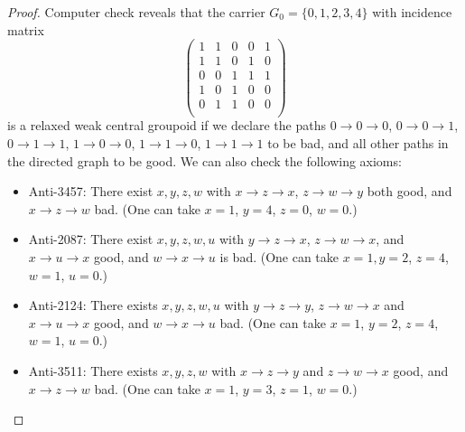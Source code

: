 \begin{proof}  Computer check reveals that the carrier $G_0=\{0,1,2,3 ,4\}$ with incidence matrix
$$
\begin{pmatrix}
  1 & 1 & 0 & 0 & 1 \\
  1 & 1 & 0 & 1 & 0 \\
  0 & 0 & 1 & 1 & 1 \\
  1 & 0 & 1 & 0 & 0 \\
  0 & 1 & 1 & 0 & 0 \\
  \end{pmatrix}
$$
is a relaxed weak central groupoid if we declare the paths $0 \to 0 \to 0$, $0 \to 0 \to 1$, $0 \to 1 \to 1$, $1 \to 0 \to 0$, $1 \to 1 \to 0$, $1 \to 1 \to 1$ to be bad, and all other paths in the directed graph to be good.  We can also check the following axioms:
\begin{itemize}
  \item Anti-3457: There exist $x,y,z,w$ with $x \to z \to x$,  $z \to w \to y$ both good, and $x \to z \to w$ bad. (One can take $x=1$, $y=4$, $z = 0$, $w = 0$.)
  \item Anti-2087: There exist $x,y,z,w,u$ with $y \to z \to x$, $z \to w \to x$, and $x \to u \to x$ good, and $w \to x \to u$ is bad. (One can take $x=1, y=2$, $z=4$, $w=1$, $u=0$.)
  \item Anti-2124: There exists $x,y,z,w,u$ with $y \to z \to y$, $z \to w \to x$ and $x \to u \to x$ good, and $w \to x \to u$  bad. (One can take $x=1$, $y=2$, $z=4$, $w = 1$, $u=0$.)
  \item Anti-3511: There exists $x,y,z,w$ with $x \to z \to y$ and $z \to w \to x$ good, and $x \to z \to w$ bad. (One can take $x=1$, $y=3$, $z = 1$, $w=0$.)
\end{itemize}


\end{proof}
